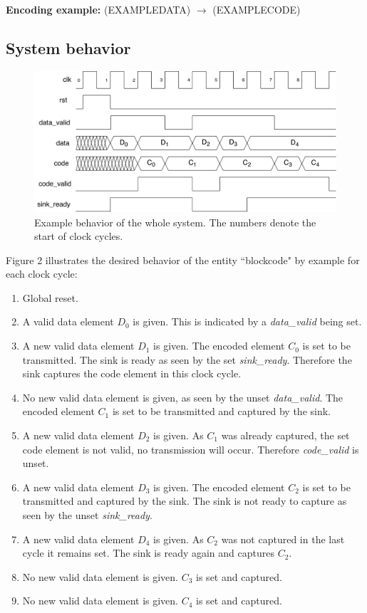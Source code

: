 \documentclass[a4paper,12pt]{article}
\begin{document}
\textbf{Encoding example:} ({{EXAMPLEDATA}}) $\longrightarrow$ ({{EXAMPLECODE}}) \\

\newpage
\subsection*{\noindent System behavior}

\begin{figure}[h!]
\includegraphics[scale=0.5]{../static/diagram.pdf}

\caption{Example behavior of the whole system. The numbers denote the start of clock cycles.}
\end{figure}

Figure 2 illustrates the desired behavior of the entity ``blockcode" by example for each clock cycle:
\begin{enumerate}
\item Global reset.
\item A valid data element $D_0$ is given. This is indicated by a \textit{data\_valid} being set.
\item A new valid data element $D_1$ is given. The encoded element $C_0$ is set to be transmitted. The sink is ready as seen by the set \textit{sink\_ready}. Therefore the sink captures the code element in this clock cycle.
\item No new valid data element is given, as seen by the unset \textit{data\_valid}. The encoded element $C_1$ is set to be transmitted and captured by the sink.
\item A new valid data element $D_2$ is given. As $C_1$ was already captured, the set code element is not valid, no transmission will occur. Therefore \textit{code\_valid} is unset.
\item A new valid data element $D_3$ is given. The encoded element $C_2$ is set to be transmitted and captured by the sink. The sink is not ready to capture as seen by the unset \textit{sink\_ready}.
\item A new valid data element $D_4$ is given. As $C_2$ was not captured in the last cycle it remains set. The sink is ready again and captures $C_2$.
\item No new valid data element is given. $C_3$ is set and captured.
\item No new valid data element is given. $C_4$ is set and captured.
\end{enumerate}
\end{document}
